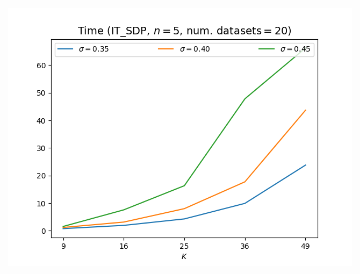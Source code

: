 \documentclass{article}
\begin{document}
\begin{figure}[h!]
        ~ 
        \begin{subfigure}[t]{0.3\textwidth}
            \centering
            \includegraphics[width=\textwidth]{3/Time.png}
            \caption{}
        \end{subfigure}
    \end{figure}
    
\end{document}
